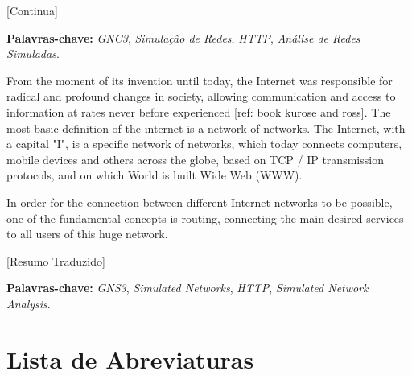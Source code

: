 [Continua]

\noindent \textbf{Palavras-chave:} \textit{GNC3}, \textit{Simulação de Redes}, \textit{HTTP}, \textit{Análise de Redes Simuladas}.


From the moment of its invention until today, the Internet was responsible for radical and profound changes in society, allowing communication and access to information at rates never before experienced [ref: book kurose and ross].
The most basic definition of the internet is a network of networks. The Internet, with a capital "I", is a specific network of networks, which today connects computers, mobile devices and others across the globe, based on TCP / IP transmission protocols, and on which World is built Wide Web (WWW).

In order for the connection between different Internet networks to be possible, one of the fundamental concepts is routing, connecting the main desired services to all users of this huge network.

[Resumo Traduzido]

\noindent \textbf{Palavras-chave:} \textit{GNS3}, \textit{Simulated Networks}, \textit{HTTP}, \textit{Simulated Network Analysis}.

\tableofcontents
\listoffigures
\listoftables
\newpage
\chapter*{Lista de Abreviaturas\hfill} 
\listofsymbols

\newpage
\pagestyle{myheadings}
